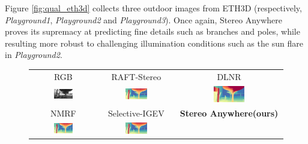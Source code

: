 \documentclass[10pt,twocolumn,letterpaper]{article}
\newcommand{\method}[0]{Stereo Anywhere\xspace}
\begin{document}
\clearpage

Figure \ref{fig:qual_eth3d} collects three outdoor images from ETH3D (respectively, \textit{Playground1}, \textit{Playground2} and \textit{Playground3}). Once again, \method proves its supremacy at predicting fine details such as branches and poles, while resulting more robust to challenging illumination conditions such as the sun flare in \textit{Playground2}.

\begin{figure}[h]
    \centering
    \renewcommand{\tabcolsep}{1pt}
    \begin{tabular}{ccc}
        \small RGB &
        \small RAFT-Stereo \cite{lipson2021raft} &
        \small DLNR \cite{zhao2023high} \\
        \includegraphics[width=0.31\textwidth]{imgs/ETH3D/rgb/15.jpg} &
        \includegraphics[width=0.31\textwidth]{imgs/ETH3D/stereo/RAFT-Stereo/15.jpg} &
        \includegraphics[width=0.31\textwidth]{imgs/ETH3D/stereo/DLNR/15.jpg} \\
        \small NMRF \cite{guan2024neural} &
        \small Selective-IGEV \cite{wang2024selective} &
        \textbf{\method (ours)} \\
        \includegraphics[width=0.31\textwidth]{imgs/ETH3D/stereo/NMRF/15.jpg} &
        \includegraphics[width=0.31\textwidth]{imgs/ETH3D/stereo/Selective/15.jpg} &

\end{tabular}
\end{figure}
\end{document}
